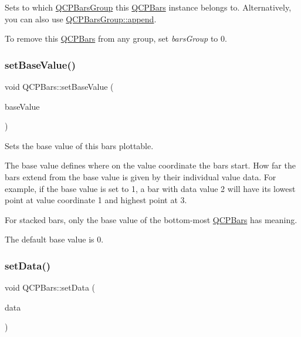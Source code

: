 Sets to which \mbox{\hyperlink{class_q_c_p_bars_group}{Q\+C\+P\+Bars\+Group}} this \mbox{\hyperlink{class_q_c_p_bars}{Q\+C\+P\+Bars}} instance belongs to. Alternatively, you can also use \mbox{\hyperlink{class_q_c_p_bars_group_a809ed63cc4ff7cd5b0b8c96b470163d3}{Q\+C\+P\+Bars\+Group\+::append}}.

To remove this \mbox{\hyperlink{class_q_c_p_bars}{Q\+C\+P\+Bars}} from any group, set {\itshape bars\+Group} to 0. \mbox{\label{class_q_c_p_bars_a574ec7eb7537566df1a28ff085d75623}} 
\subsubsection{\texorpdfstring{setBaseValue()}{setBaseValue()}}
{\footnotesize\ttfamily void Q\+C\+P\+Bars\+::set\+Base\+Value (\begin{DoxyParamCaption}\item[{double}]{base\+Value }\end{DoxyParamCaption})}

Sets the base value of this bars plottable.

The base value defines where on the value coordinate the bars start. How far the bars extend from the base value is given by their individual value data. For example, if the base value is set to 1, a bar with data value 2 will have its lowest point at value coordinate 1 and highest point at 3.

For stacked bars, only the base value of the bottom-\/most \mbox{\hyperlink{class_q_c_p_bars}{Q\+C\+P\+Bars}} has meaning.

The default base value is 0. \mbox{\label{class_q_c_p_bars_a6dc562ec7120a8521e1061f2134367e4}} 
\subsubsection{\texorpdfstring{setData()}{setData()}\hspace{0.1cm}{\footnotesize\ttfamily [1/2]}}
{\footnotesize\ttfamily void Q\+C\+P\+Bars\+::set\+Data (\begin{DoxyParamCaption}\item[{Q\+Shared\+Pointer$<$ \mbox{\hyperlink{qcustomplot_8h_a52bf589c9fce1baa36c1d40d69785d46}{Q\+C\+P\+Bars\+Data\+Container}} $>$}]{data }\end{DoxyParamCaption})}


